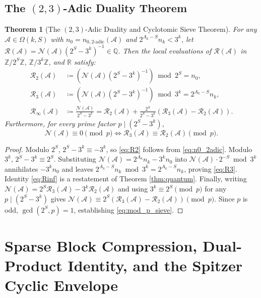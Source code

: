 \documentclass[11pt, a4paper]{amsart}
\newtheorem{theorem}{Theorem}[section]
\theoremstyle{definition}
\newcommand{\Z}{\mathbb{Z}}
\newcommand{\Q}{\mathbb{Q}}
\newcommand{\R}{\mathbb{R}}
\newcommand{\N}{\mathcal{N}}
\newcommand{\A}{\mathcal{A}}
\newcommand{\Rcal}{\mathcal{R}}
\begin{document}
\subsection{The $(2,3)$-Adic Duality Theorem}

\begin{theorem}[The $(2,3)$-Adic Duality and Cyclotomic Sieve Theorem]\label{thm:duality}
For any $\A \in \Omega(k, S)$ with $n_0 = n_{0,\text{2-adic}}(\A)$ and $2^{A_k - S} n_k < 3^k$, let $\Rcal(\A) = \N(\A) (2^S - 3^k)^{-1} \in \Q$. Then the local evaluations of $\Rcal(\A)$ in $\Z/2^S\Z$, $\Z/3^k\Z$, and $\R$ satisfy:
\begin{align}
\Rcal_2(\A) &\coloneqq \left( \N(\A) (2^S - 3^k)^{-1} \right) \bmod 2^S = n_0, \label{eq:R2} \\
\Rcal_3(\A) &\coloneqq \left( \N(\A) (2^S - 3^k)^{-1} \right) \bmod 3^k = 2^{A_k - S} n_k, \label{eq:R3} \\
\Rcal_\infty(\A) &\coloneqq \frac{\N(\A)}{2^S - 3^k} = \Rcal_2(\A) + \frac{2^S}{2^S - 3^k}\left( \Rcal_3(\A) - \Rcal_2(\A) \right). \label{eq:Rinf}
\end{align}
Furthermore, for every prime factor $p \mid (2^S - 3^k)$,
\begin{equation}\label{eq:mod_p_sieve}
\N(\A) \equiv 0 \pmod p \iff \Rcal_3(\A) \equiv \Rcal_2(\A) \pmod p.
\end{equation}
\end{theorem}

\begin{proof}
Modulo $2^S$, $2^S - 3^k \equiv -3^k$, so \eqref{eq:R2} follows from \eqref{eq:n0_2adic}. Modulo $3^k$, $2^S - 3^k \equiv 2^S$. Substituting $\N(\A) = 2^{A_k} n_k - 3^k n_0$ into $\N(\A) \cdot 2^{-S} \bmod 3^k$ annihilates $-3^k n_0$ and leaves $2^{A_k - S} n_k \bmod 3^k = 2^{A_k - S} n_k$, proving \eqref{eq:R3}. Identity \eqref{eq:Rinf} is a restatement of Theorem \ref{thm:quantum}. Finally, writing $\N(\A) = 2^S \Rcal_3(\A) - 3^k \Rcal_2(\A)$ and using $3^k \equiv 2^S \pmod p$ for any $p \mid (2^S - 3^k)$ gives $\N(\A) \equiv 2^S (\Rcal_3(\A) - \Rcal_2(\A)) \pmod p$. Since $p$ is odd, $\gcd(2^S, p) = 1$, establishing \eqref{eq:mod_p_sieve}.
\end{proof}

\section{Sparse Block Compression, Dual-Product Identity, and the Spitzer Cyclic Envelope}
\end{document}
